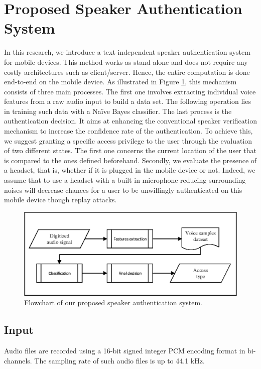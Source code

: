 \documentclass[cryptography,article,submit,moreauthors,pdftex,10pt,a4paper]{mdpi}
\begin{document}
\section{Proposed Speaker Authentication System}
In this research, we introduce a text independent speaker authentication system for mobile devices. This method works as stand-alone and does not require any costly architectures such as client/server. Hence, the entire computation is done end-to-end on the mobile device. As illustrated in Figure \ref{fig:1}, this mechanism consists of three main processes. The first one involves extracting individual voice features from a raw audio input to build a data set. The following operation lies in training such data with a Na\"ive Bayes classifier. The last process is the authentication decision. It aims at enhancing the conventional speaker verification mechanism to increase the confidence rate of the authentication. To achieve this, we suggest granting a specific access privilege to the user through the evaluation of two different states. The first one concerns the current location of the user that is compared to the ones defined beforehand. Secondly, we evaluate the presence of a headset, that is, whether if it is plugged in the mobile device or not. Indeed, we assume that to use a headset with a built-in microphone reducing surrounding noises will decrease chances for a user to be unwillingly authenticated on this mobile device though replay attacks. \cite{41}

\begin{figure}[H]
	\centering
	\includegraphics[width=10 cm]{1.eps}
	\caption{Flowchart of our proposed speaker authentication system.}
	\label{fig:1}
\end{figure}

\subsection{Input}

Audio files are recorded using a 16-bit signed integer PCM encoding format in bi-channels. The sampling rate of such audio files is up to 44.1 kHz.
\end{document}
